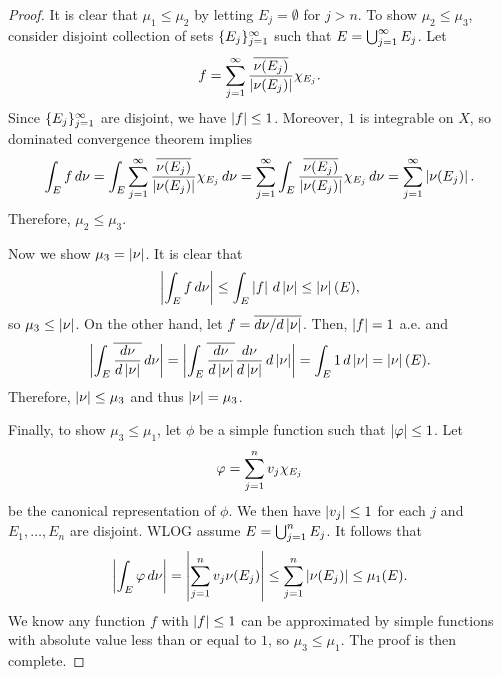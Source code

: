 \documentclass[a4paper]{article}
\begin{document}
\begin{proof}
It is clear that $\mu_1 \leq \mu_2$ by letting $E_j = \emptyset$
for $j > n$. To show $\mu_2 \leq \mu_3$, 
consider disjoint collection of sets $\{ E_j \}_{j=1}^\infty$ such 
that $E = \bigcup_{j=1}^\infty E_j$. Let 
\[
f = \sum_{j=1}^\infty \frac{\overline{\nu(E_j)}}{\left\lvert \nu(E_j)\right\rvert} \chi_{E_j}.
\]
Since $\{ E_j \}_{j=1}^\infty$ are disjoint, we have $\left\lvert f\right\rvert \leq 1$.
Moreover, $1$ is integrable on $X$, 
so dominated convergence theorem implies 
\[
\int_E f \, d \nu 
= \int_E \sum_{j=1}^\infty \frac{\overline{\nu(E_j)}}{\left\lvert \nu(E_j)\right\rvert} 
\chi_{E_j} \, d \nu
= \sum_{j=1}^\infty \int_E \frac{\overline{\nu(E_j)}}{\left\lvert \nu(E_j)\right\rvert} 
\chi_{E_j} \, d \nu
= \sum_{j=1}^\infty \left\lvert \nu(E_j)\right\rvert.
\]
Therefore, $\mu_2 \leq \mu_3$.

Now we show $\mu_3 = \left\lvert \nu\right\rvert$. 
It is clear that 
\[
\left\lvert \int_E f \, d \nu\right\rvert \leq \int_E \left\lvert f\right\rvert \, d \left\lvert \nu\right\rvert
\leq \left\lvert \nu\right\rvert (E),
\]
so $\mu_3 \leq \left\lvert \nu\right\rvert$.
On the other hand, let $f = \overline{d \nu / d \left\lvert \nu\right\rvert}$.
Then, $\left\lvert f\right\rvert = 1$ a.e. and 
\[
\left\lvert \int_E \overline{\frac{d \nu}{d \left\lvert \nu\right\rvert}} \, d \nu\right\rvert 
= \left\lvert \int_E \overline{\frac{d \nu}{d \left\lvert \nu\right\rvert}} 
\frac{d \nu}{d \left\lvert \nu\right\rvert} \, d \left\lvert \nu\right\rvert\right\rvert
= \int_E 1 \, d \left\lvert \nu\right\rvert
= \left\lvert \nu\right\rvert (E).
\]
Therefore, $\left\lvert \nu\right\rvert \leq \mu_3$ and thus $\left\lvert \nu\right\rvert 
= \mu_3$.

Finally, to show $\mu_3 \leq \mu_1$, let $\phi$ be a simple 
function such that $\left\lvert \varphi\right\rvert \leq 1$. Let 
\[
\varphi = \sum_{j=1}^n v_j \chi_{E_j}
\]
be the canonical representation of $\phi$. We then have 
$\left\lvert v_j\right\rvert \leq 1$ for each $j$ and $E_1, \dots, E_n$ 
are disjoint. WLOG assume 
$E = \bigcup_{j=1}^n E_j$. It follows that 
\[
\begin{aligned}
\left\lvert \int_E \varphi \, d \nu\right\rvert
= \left\lvert \sum_{j=1}^n v_j {\nu(E_j)}\right\rvert
\leq \sum_{j=1}^n \left\lvert \nu (E_j)\right\rvert \leq \mu_1 (E).
\end{aligned}
\]
We know any function $f$ with $\left\lvert f\right\rvert \leq 1$ can 
be approximated by simple functions with absolute 
value less than or equal to $1$, so $\mu_3 \leq \mu_1$. 
The proof is then complete.
\end{proof}
\end{document}
